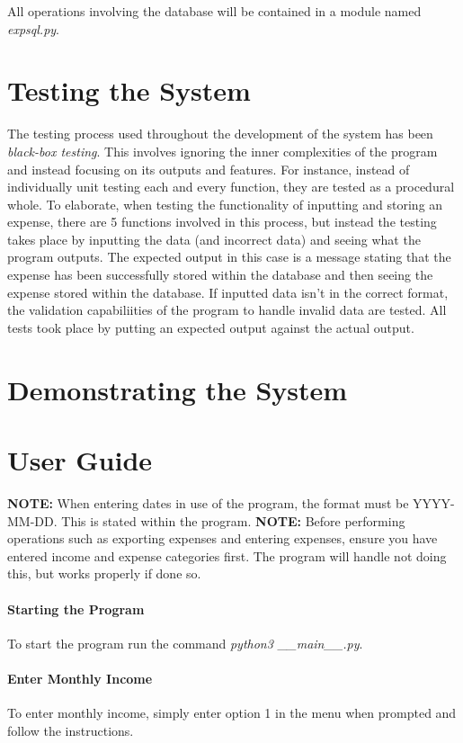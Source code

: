 \documentclass[12pt]{article}
\begin{document}
  All operations involving the database will be contained in a module named \textit{expsql.py}.

  \section{Testing the System}
  The testing process used throughout the development of the system has been \textit{black-box testing}. This involves ignoring the inner complexities of the program and instead focusing on its outputs and features. For instance, instead of individually unit testing each and every function, they are tested as a procedural whole. To elaborate, when testing the functionality of inputting and storing an expense, there are 5 functions involved in this process, but instead the testing takes place by inputting the data (and incorrect data) and seeing what the program outputs. The expected output in this case is a message stating that the expense has been successfully stored within the database and then seeing the expense stored within the database. If inputted data isn't in the correct format, the validation capabiliities of the program to handle invalid data are tested. All tests took place by putting an expected output against the actual output.
  \section{Demonstrating the System}

  \appendix
  \section{User Guide}
  \textbf{NOTE:} When entering dates in use of the program, the format must be YYYY-MM-DD. This is stated within the program.
  \textbf{NOTE:} Before performing operations such as exporting expenses and entering expenses, ensure you have entered income and expense categories first. The program will handle not doing this, but works properly if done so.
  \paragraph{Starting the Program} To start the program run the command \textit{python3 \_\_main\_\_.py}. 
  \paragraph{Enter Monthly Income}
  To enter monthly income, simply enter option 1 in the menu when prompted and follow the instructions.
\end{document}
